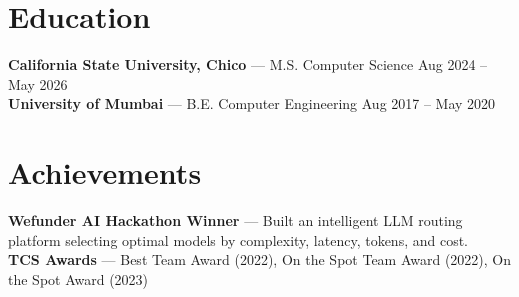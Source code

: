 \documentclass[10pt]{article}
\begin{document}

\section*{Education}

\textbf{California State University, Chico} --- M.S. Computer Science \hfill Aug 2024 -- May 2026 \\
\textbf{University of Mumbai} --- B.E. Computer Engineering \hfill Aug 2017 -- May 2020


\section*{Achievements}

\textbf{Wefunder AI Hackathon Winner} --- Built an intelligent LLM routing platform selecting optimal models by complexity, latency, tokens, and cost. \\
\textbf{TCS Awards} --- Best Team Award (2022), On the Spot Team Award (2022), On the Spot Award (2023)
\end{document}

